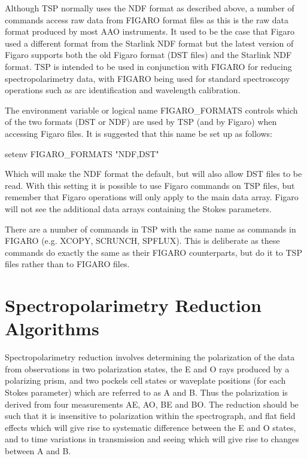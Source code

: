 \documentclass[11pt,twoside,nolof,noabs]{starlink}
\begin{document}
Although TSP normally uses the NDF format as described above, a
number of commands access raw data from FIGARO format files as this is the
raw data format produced by most AAO instruments. It used to be the case that
Figaro used a different format from the Starlink NDF format but the latest
version of Figaro supports both the old Figaro format (DST files) and the
Starlink NDF format. TSP is intended to be used in conjunction with FIGARO for
reducing spectropolarimetry data, with FIGARO being used for standard
spectroscopy operations such as arc identification and wavelength calibration.

The environment variable or logical name FIGARO\_FORMATS controls which of the two formats (DST or NDF)
are used by TSP (and by Figaro)  when accessing Figaro files. It is suggested
that this name be set up as follows:

\begin{terminalv}
   setenv FIGARO_FORMATS "NDF,DST"
\end{terminalv}


Which will make the NDF format the default, but will also allow DST files to
be read. With this setting it is possible to use Figaro commands on TSP files,
but remember that Figaro operations will only apply to the main data array.
Figaro will not see the additional data arrays containing the Stokes
parameters.

There are a number of commands in TSP with the same name as commands in
FIGARO (e.g. XCOPY, SCRUNCH, SPFLUX). This is deliberate as these commands
do exactly the same as their FIGARO counterparts, but do it to TSP files
rather than to FIGARO files.

\section{Spectropolarimetry Reduction Algorithms}

Spectropolarimetry reduction involves determining the polarization of the
data from observations in two polarization states, the E and O rays produced by
a polarizing prism, and two pockels cell states or waveplate positions
(for each Stokes parameter) which are referred to as A and B. Thus the
polarization is derived from four measurements AE, AO, BE and BO. The reduction
should be such that it is insensitive to polarization within the spectrograph,
and flat field effects which will give rise to systematic difference between
the E and O states, and to time variations in transmission and seeing which
will give rise to changes between A and B.
\end{document}
